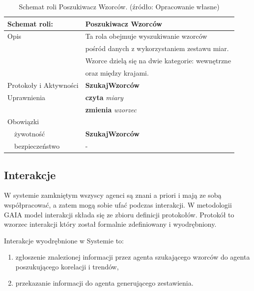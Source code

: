 \documentclass[11pt]{report}
\begin{document}
    \begin{table}[ht!]
        \begin{tabular}{ll}
            Schemat roli:          & Poszukiwacz Wzorców                             \\ \hline
            Opis                   & Ta rola obejmuje wyszukiwanie wzorców           \\
            & pośród danych z wykorzystaniem zestawu miar.    \\
            & Wzorce dzielą się na dwie kategorie: wewnętrzne \\
            & oraz między krajami.                            \\
            Protokoły i Aktywności & \textbf{SzukajWzorców}                          \\
            Uprawnienia            & \textbf{czyta} \textit{miary}                   \\
            & \textbf{zmienia} \textit{wzorzec}               \\
            Obowiązki              &                                                 \\
            ~~żywotność            & \textbf{SzukajWzorców}                          \\
            ~~bezpieczeństwo       & -                                               \\
        \end{tabular}
        \caption{Schemat roli Poszukiwacz Wzorców. (źródło: Opracowanie własne)}
        \label{tab:schemat roli Poszukiwacz Wzorców}
    \end{table}

    \subsection{Interakcje}
    W systemie zamkniętym wszyscy agenci są znani a priori i mają ze sobą współpracować, a zatem mogą sobie ufać podczas interakcji.
    W metodologii GAIA model interakcji składa się ze zbioru definicji protokołów.
    Protokół to wzorzec interakcji który został formalnie zdefiniowany i wyodrębniony.

    Interakcje wyodrębnione w Systemie to:

    \begin{enumerate}
        \item zgłoszenie znalezionej informacji przez agenta szukającego wzorców do agenta poszukującego korelacji i trendów,
        \item przekazanie informacji do agenta generującego zestawienia.
    \end{enumerate}
\end{document}
